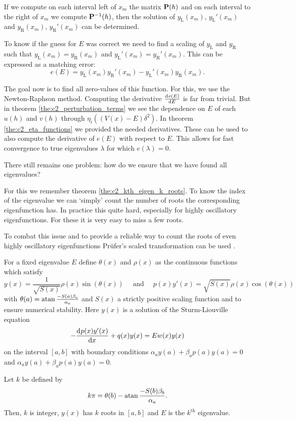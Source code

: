 If we compute on each interval left of $x_m$ the matrix $\vb{P}(h)$ and on each interval to the right of $x_m$ we compute $\vb{P}^{-1}(h)$, then the solution of $y_\text{L}(x_m)$, $y_\text{L}'(x_m)$ and $y_\text{R}(x_m)$, $y_\text{R}'(x_m)$ can be determined.

To know if the guess for $E$ was correct we need to find a scaling of $y_\text{L}$ and $y_\text{R}$ such that $y_\text{L}(x_m) = y_\text{R}(x_m)$ and $y_\text{L}'(x_m) = y_\text{R}'(x_m)$. This can be expressed as a matching error:
$$
    e(E) = y_\text{L}(x_m) y_\text{R}'(x_m) - y_\text{L}'(x_m) y_\text{R}(x_m)\text{.}
$$

The goal now is to find all zero-values of this function. For this, we use the Newton-Raphson method. Computing the derivative $\dv[]{e(E)}{E}$ is far from trivial. But in theorem \ref{the:c2_perturbation_terms} we see the dependence on $E$ of each $u(h)$ and $v(h)$ through $\eta_i\left((V(x) - E)\delta^2\right)$. In theorem \ref{the:c2_eta_functions} we provided the needed derivatives. These can be used to also compute the derivative of $e(E)$ with respect to $E$. This allows for fast convergence to true eigenvalues $\lambda$ for which $e(\lambda) = 0$.

There still remains one problem: how do we ensure that we have found all eigenvalues?

For this we remember theorem \ref{the:c2_kth_eigen_k_roots}. To know the index of the eigenvalue we can `simply' count the number of roots the corresponding eigenfunction has. In practice this quite hard, especially for highly oscillatory eigenfunctions. For these it is very easy to miss a few roots.

To combat this issue and to provide a reliable way to count the roots of even highly oscillatory eigenfunctions Prüfer's scaled transformation can be used \cite{pruefer_neue_1926}.

\begin{theorem}[Prüfer 1926]
    For a fixed eigenvalue $E$ define $\theta(x)$ and $\rho(x)$ as the continuous functions which satisfy
    \begin{equation}\label{equ:c2_prufer_theta}
        y(x) = \frac{1}{\sqrt{S(x)}} \rho(x) \sin(\theta(x)) \quad\text{ and }\quad p(x)y'(x) = \sqrt{S(x)} \rho(x) \cos(\theta(x))
    \end{equation}
    with $\theta(a) = \atan\frac{-S(a)\beta_a}{\alpha_a}$ and $S(x)$ a strictly positive scaling function and to ensure numerical stability.
    Here $y(x)$ is a solution of the Sturm-Liouville equation
    $$
        -\dv[]{p(x)y'(x)}{x} + q(x) y(x) = E w(x) y(x)
    $$
    on the interval $[a, b]$ with boundary conditions $\alpha_a y(a) + \beta_a p(a) y(a) = 0$ and $\alpha_a y(a) + \beta_a p(a) y(a) = 0$.

    Let  $k$ be defined by
    $$
        k\pi = \theta(b) - \atan\frac{-S(b)\beta_b}{\alpha_a} \text{.}
    $$
    Then, $k$ is integer, $y(x)$ has $k$ roots in $[a, b]$ and $E$ is the $k^\text{th}$ eigenvalue.
\end{theorem}

